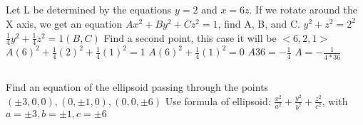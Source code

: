 \documentclass[11pt]{article}
\begin{document}
\begin{paracol}{2}
        \subsection{}
        \begin{fleqn}
            Let L be determined by the equations $y=2$ and $x=6z$. If we rotate around the X axis, we get an equation
            \newline
            $Ax^2 + By^2 + Cz^2 = 1$, find A, B, and C.\newline
            $y^2 + z^2 = 2^2$ \newline
            $\frac{1}{4}y^2 + \frac{1}{4}z^2 = 1  (B,C)$ \newline
            Find a second point, this case it will be $<6,2,1>$ \newline
            $A(6)^2 + \frac{1}{4}(2)^2 + \frac{1}{4}(1)^2 = 1$ \newline
            $A(6)^2 + \frac{1}{4}(1)^2 = 0$ \newline
            $A36 = - \frac{1}{4}$ \newline
            $A = - \frac{1}{4*36}$ \newline
        \end{fleqn}

        \subsection{}
        \begin{fleqn}
            Find an equation of the ellipsoid passing through the points \newline
            $(\pm3,0,0),(0,\pm1,0),(0,0,\pm6) $ \newline
            Use formula of ellipsoid: $\frac{x^2}{a^2} + \frac{y^2}{b^2} + \frac{z^2}{c^2}$, with $a=\pm3, b=\pm1, c=\pm 6$
        \end{fleqn}

    \end{paracol}
\end{document}
